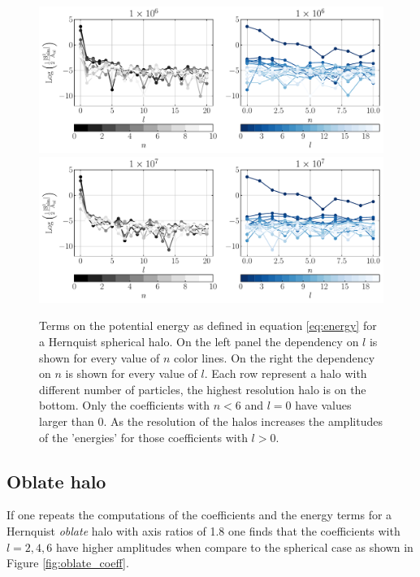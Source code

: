 \documentclass[14pt]{article}
\begin{document}
\begin{figure}[H]
  \centering
  \includegraphics[scale=0.5]{../code/energy_terms_hern_a_40_1E6.pdf}
  \includegraphics[scale=0.5]{../code/energy_terms_hern_a_40_1E7.pdf}
  \caption{Terms on the potential energy as defined in equation 
  \ref{eq:energy} for a Hernquist spherical halo. On the left panel the dependency on $l$ is shown for every value of $n$ color lines. 
On the right the dependency on $n$ is shown for every value of $l$. Each row represent a halo with different number of particles, the highest resolution halo is on the bottom. Only the coefficients 
with $n<6$ and $l=0$ have values larger than 0. As the resolution of the halos increases the amplitudes 
of the 'energies' for those coefficients with $l>0$.}\label{fig:spherical_energy}
\end{figure}

\subsection{Oblate halo}

If one repeats the computations of the coefficients and the energy terms for a
Hernquist \textit{oblate} halo with axis ratios of 1.8 one finds that the coefficients
with $l=2,4,6$ have higher amplitudes when compare to the spherical case as shown
in Figure \ref{fig:oblate_coeff}. 
\end{document}
